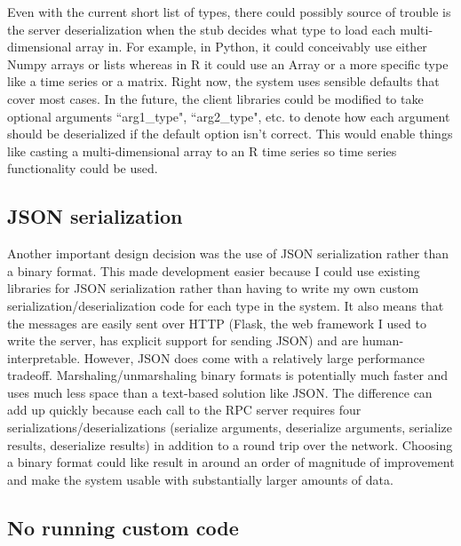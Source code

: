 \documentclass[11pt]{article}
\begin{document}
Even with the current short list of types, there could possibly source of trouble is the server deserialization when the stub decides what type to load each multi-dimensional array in. For example, in Python, it could conceivably use either Numpy arrays or lists whereas in R it could use an Array or a more specific type like a time series or a matrix. Right now, the system uses sensible defaults that cover most cases. In the future, the client libraries could be modified to take optional arguments ``arg1\_type", ``arg2\_type", etc. to denote how each argument should be deserialized if the default option isn't correct. This would enable things like casting a multi-dimensional array to an R time series so time series functionality could be used. 

\subsection{JSON serialization}

Another important design decision was the use of JSON serialization rather than a binary format. This made development easier because I could use existing libraries for JSON serialization rather than having to write my own custom serialization/deserialization code for each type in the system. It also means that the messages are easily sent over HTTP (Flask, the web framework I used to write the server, has explicit support for sending JSON) and are human-interpretable. However, JSON does come with a relatively large performance tradeoff. Marshaling/unmarshaling binary formats is potentially much faster and uses much less space than a text-based solution like JSON. The difference can add up quickly because each call to the RPC server requires four serializations/deserializations (serialize arguments, deserialize arguments, serialize results, deserialize results) in addition to a round trip over the network. Choosing a binary format could like result in around an order of magnitude of improvement and make the system usable with substantially larger amounts of data. 


\subsection{No running custom code}
\end{document}
